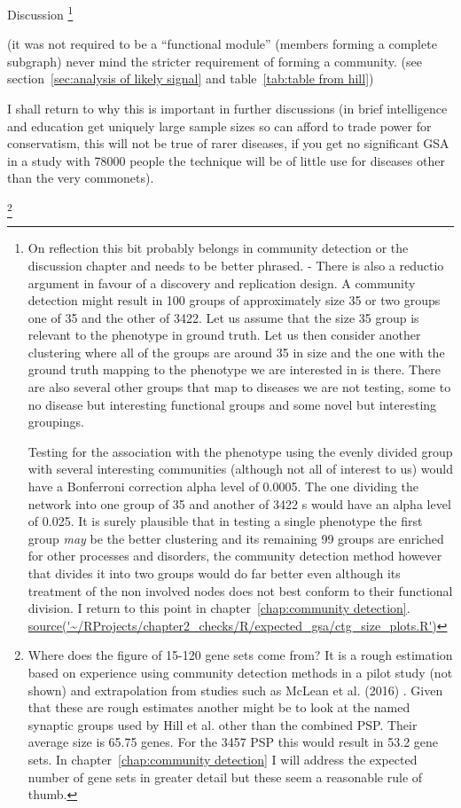 Discussion
\footnote{On reflection this bit probably belongs in community detection or the discussion chapter and needs to be better phrased. - There is also a reductio argument in favour of a discovery and replication design.  A community detection might result in 100 groups of approximately size 35 or two groups one of 35 and the other of 3422. Let us assume that the size 35 group is relevant to the phenotype in ground truth. Let us then consider another clustering where all of the groups are around 35 in size and the one with the ground truth mapping to the phenotype we are interested in is there. There are also several other groups that map to diseases we are not testing, some to no disease but interesting functional groups and some novel but interesting groupings. 

Testing for the association with the phenotype using the evenly divided group with several interesting communities (although not all of interest to us)  would have a Bonferroni correction alpha level of 0.0005. The one dividing the network into one group of 35 and another of 3422 s would have an alpha level of 0.025. It is surely plausible that in testing a single phenotype the first group \textit{may} be the better clustering and its remaining 99 groups are enriched for other processes and disorders, the community detection method however that divides it into two groups would do far better even although its treatment of the non involved nodes does not best conform to their functional division. I return to this point in chapter~\ref{chap:community detection}.
\url{ source('~/RProjects/chapter2_checks/R/expected_gsa/ctg_size_plots.R')}}

 (it was not required to be a ``functional module'' (members forming a complete subgraph) never mind the stricter requirement of forming a community. (see section~\ref{sec:analysis of likely signal} and table~\ref{tab:table from hill})


I shall return to why this is important in further discussions (in brief intelligence and education get uniquely large sample sizes so can afford to trade power for conservatism, this will not be true of rarer diseases, if you get no significant GSA in a study with 78000 people the technique will be of little use for diseases other than the very commonets). 


\footnote{Where does the figure of 15-120 gene sets come from? It is a rough estimation based on experience using community detection methods in a pilot study (not shown) and extrapolation from studies such as McLean et al. (2016) \cite{mclean2016improved}. Given that these are rough estimates another might be to look at the named synaptic groups used by Hill et al.\cite{hill2014human} other than the combined PSP.  Their average size is 65.75 genes. For the 3457 PSP this would result in 53.2 gene sets. In chapter~\ref{chap:community detection} I will address the expected number of gene sets in greater detail but these seem a reasonable rule of thumb.} 


